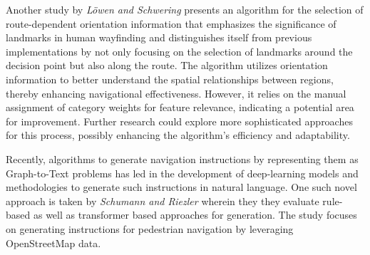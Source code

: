 Another study by \textit{Löwen and Schwering} \cite{lowen-2020} presents an algorithm for the selection of route-dependent orientation information that emphasizes the significance of landmarks in human wayfinding and distinguishes itself from previous implementations by not only focusing on the selection of landmarks around the decision point but also along the route. The algorithm utilizes orientation information to better understand the spatial relationships between regions, thereby enhancing navigational effectiveness. However, it relies on the manual assignment of category weights for feature relevance, indicating a potential area for improvement. Further research could explore more sophisticated approaches for this process, possibly enhancing the algorithm's efficiency and adaptability.

Recently, algorithms to generate navigation instructions by representing them as Graph-to-Text problems has led in the development of deep-learning models and methodologies to generate such instructions in natural language. One such novel approach is taken by \textit{Schumann and Riezler} \cite{schumann-riezler-2021-generating} wherein they they evaluate rule-based as well as transformer based approaches for generation. The study focuses on generating instructions for pedestrian navigation by leveraging OpenStreetMap data.


